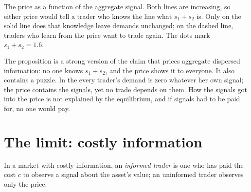 \begin{omfigure}

{\small The price as a function of the aggregate signal. Both lines are increasing, so either price
would tell a trader who knows the line what $s_1 + s_2$ is. Only on the solid line does that knowledge leave
demands unchanged; on the dashed line, traders who learn from the price want to trade again. The dots
mark $s_1 + s_2 = 1.6$.}
\end{omfigure}

The proposition is a strong version of the claim that prices aggregate dispersed information: no one
knows $s_1 + s_2$, and the price shows it to everyone. It also contains a puzzle. In the  every trader's demand is zero whatever her own signal; the price contains the signals, yet no
trade depends on them. How the signals got into the price is not explained by the equilibrium, and if
signals had to be paid for, no one would pay.

\section{The limit: costly information}\label{sec:b2:prices-as-information:costly}

\begin{definition}\label{def:b2:prices-as-information:informed-trader}
In a market with costly information, an \emph{informed trader} is one who has
paid the cost $c$ to observe a signal about the asset's value; an uninformed trader observes only the
price.
\end{definition}

